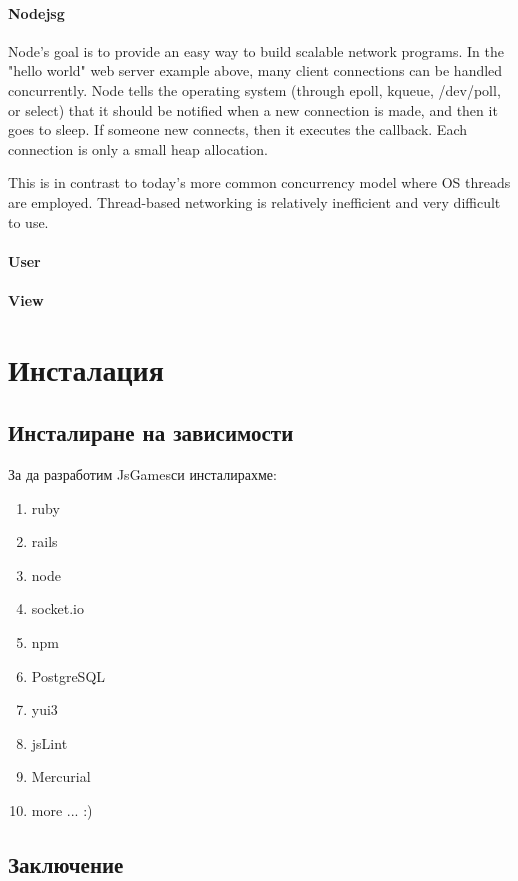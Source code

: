 \documentclass[a4paper]{article}
\def\jsg{JsGames}
\begin{document}

\paragraph{Nodejsg}
Node's goal is to provide an easy way to build scalable network programs. In the "hello world" web server example above, many client connections can be handled concurrently. Node tells the operating system (through epoll, kqueue, /dev/poll, or select) that it should be notified when a new connection is made, and then it goes to sleep. If someone new connects, then it executes the callback. Each connection is only a small heap allocation.

This is in contrast to today's more common concurrency model where OS threads are employed. Thread-based networking is relatively inefficient and very difficult to use.

\paragraph{User}

\paragraph{View}

\section{Инсталация}

\subsection{Инсталиране на зависимости}

За да разработим \jsg си инсталирахме:
\begin{enumerate}
  \item ruby
  \item rails
  \item node
  \item socket.io
  \item npm
  \item PostgreSQL
  \item yui3
  \item jsLint
  \item Mercurial
  \item more ... :)
\end{enumerate}

\subsection{Заключение}
\end{document}
